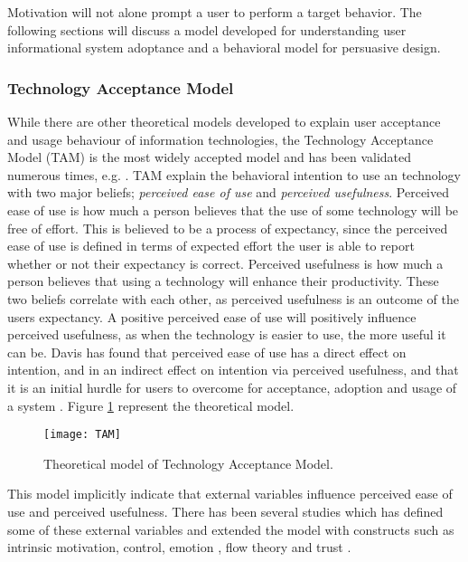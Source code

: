 Motivation will not alone prompt a user to perform a target behavior. The following sections will discuss a model developed for understanding user informational system adoptance and a behavioral model for persuasive design.

\subsubsection{Technology Acceptance Model}
While there are other theoretical models developed to explain user acceptance and usage behaviour of information technologies, the Technology Acceptance Model (TAM) \cite{Davis1989} \cite{Davis1989a} is the most widely accepted model and has been validated numerous times, e.g. \cite{Hu1999} \cite{Chau1996} \cite{Mathieson1991}. TAM explain the behavioral intention to use an technology with two major beliefs; \textit{perceived ease of use} and \textit{perceived usefulness}. Perceived ease of use is how much a person believes that the use of some technology will be free of effort. This is believed to be a process of expectancy, since the perceived ease of use is defined in terms of expected effort the user is able to report whether or not their expectancy is correct. Perceived usefulness is how much a person believes that using a technology will enhance their productivity. These two beliefs correlate with each other, as perceived usefulness is an outcome of the users expectancy. A positive perceived ease of use will positively influence perceived usefulness, as when the technology is easier to use, the more useful it can be. Davis \cite{Davis1989} has found that perceived ease of use has a direct effect on intention, and in an indirect effect on intention via perceived usefulness, and that it is an initial hurdle for users to overcome for acceptance, adoption and usage of a system \cite{Davis1989a}. Figure \ref{fig:TAM} represent the theoretical model.

\begin{figure}[h]
  \centering
    \texttt{[image: TAM]}
  \caption{Theoretical model of Technology Acceptance Model.}
  \label{fig:TAM}
\end{figure}

This model implicitly indicate that external variables influence perceived ease of use and perceived usefulness. There has been several studies which has defined some of these external variables and extended the model with constructs such as intrinsic motivation, control, emotion \cite{Venkatesh2000}, flow theory \cite{Koufaris2002} and trust \cite{Gefen2003}.


